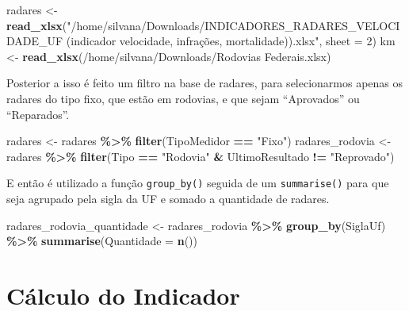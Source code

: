 \documentclass[
]{book}
\newenvironment{Shaded}{\begin{snugshade}}{\end{snugshade}}
\newcommand{\AttributeTok}[1]{\textcolor[rgb]{0.13,0.29,0.53}{#1}}
\newcommand{\DecValTok}[1]{\textcolor[rgb]{0.00,0.00,0.81}{#1}}
\newcommand{\FunctionTok}[1]{\textcolor[rgb]{0.13,0.29,0.53}{\textbf{#1}}}
\newcommand{\NormalTok}[1]{#1}
\newcommand{\OtherTok}[1]{\textcolor[rgb]{0.56,0.35,0.01}{#1}}
\newcommand{\SpecialCharTok}[1]{\textcolor[rgb]{0.81,0.36,0.00}{\textbf{#1}}}
\newcommand{\StringTok}[1]{\textcolor[rgb]{0.31,0.60,0.02}{#1}}
\begin{document}
\begin{Shaded}
\begin{Highlighting}[]
\NormalTok{radares }\OtherTok{\textless{}{-}} \FunctionTok{read\_xlsx}\NormalTok{(}\StringTok{"/home/silvana/Downloads/INDICADORES\_RADARES\_VELOCIDADE\_UF (indicador velocidade, infrações, mortalidade)).xlsx"}\NormalTok{, }\AttributeTok{sheet =} \DecValTok{2}\NormalTok{)}
\NormalTok{km }\OtherTok{\textless{}{-}} \FunctionTok{read\_xlsx}\NormalTok{(}\StringTok{\textquotesingle{}/home/silvana/Downloads/Rodovias Federais.xlsx\textquotesingle{}}\NormalTok{)}
\end{Highlighting}
\end{Shaded}

Posterior a isso é feito um filtro na base de radares, para selecionarmos apenas os radares do tipo fixo, que estão em rodovias, e que sejam ``Aprovados'' ou ``Reparados''.

\begin{Shaded}
\begin{Highlighting}[]
\NormalTok{radares }\OtherTok{\textless{}{-}}\NormalTok{ radares }\SpecialCharTok{\%\textgreater{}\%} 
  \FunctionTok{filter}\NormalTok{(TipoMedidor }\SpecialCharTok{==} \StringTok{"Fixo"}\NormalTok{)}
\NormalTok{radares\_rodovia }\OtherTok{\textless{}{-}}\NormalTok{ radares }\SpecialCharTok{\%\textgreater{}\%} 
  \FunctionTok{filter}\NormalTok{(Tipo }\SpecialCharTok{==} \StringTok{"Rodovia"} \SpecialCharTok{\&} 
\NormalTok{           UltimoResultado }\SpecialCharTok{!=} \StringTok{"Reprovado"}\NormalTok{)}
\end{Highlighting}
\end{Shaded}

E então é utilizado a função \texttt{group\_by()} seguida de um \texttt{summarise()} para que seja agrupado pela sigla da UF e somado a quantidade de radares.

\begin{Shaded}
\begin{Highlighting}[]
\NormalTok{radares\_rodovia\_quantidade }\OtherTok{\textless{}{-}}\NormalTok{ radares\_rodovia }\SpecialCharTok{\%\textgreater{}\%} 
  \FunctionTok{group\_by}\NormalTok{(SiglaUf) }\SpecialCharTok{\%\textgreater{}\%} 
  \FunctionTok{summarise}\NormalTok{(}\AttributeTok{Quantidade =} \FunctionTok{n}\NormalTok{())}
\end{Highlighting}
\end{Shaded}

\section{Cálculo do Indicador}\label{cuxe1lculo-do-indicador}
\end{document}
